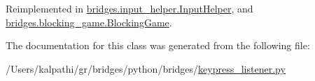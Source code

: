 Reimplemented in \mbox{\hyperlink{classbridges_1_1input__helper_1_1_input_helper_ac1501918e03c17ae99e8d04d7576c58e}{bridges.\+input\+\_\+helper.\+Input\+Helper}}, and \mbox{\hyperlink{classbridges_1_1blocking__game_1_1_blocking_game_aa8cda5f9304b87b66f6794a1b1f5a7db}{bridges.\+blocking\+\_\+game.\+Blocking\+Game}}.



The documentation for this class was generated from the following file\+:\begin{DoxyCompactItemize}
\item 
/\+Users/kalpathi/gr/bridges/python/bridges/\mbox{\hyperlink{keypress__listener_8py}{keypress\+\_\+listener.\+py}}\end{DoxyCompactItemize}
